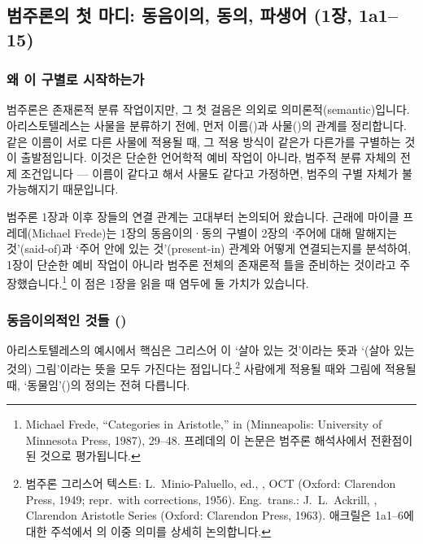 \documentclass[12pt, a4paper]{article}
\begin{document}
\thispagestyle{firstpage}


\subsection{범주론의 첫 마디: 동음이의, 동의, 파생어 (1장, 1a1--15)}

\subsubsection{왜 이 구별로 시작하는가}

범주론은 존재론적 분류 작업이지만, 그 첫 걸음은 의외로 의미론적(semantic)입니다. 아리스토텔레스는 사물을 분류하기 전에, 먼저 이름()과 사물()의 관계를 정리합니다. 같은 이름이 서로 다른 사물에 적용될 때, 그 적용 방식이 같은가 다른가를 구별하는 것이 출발점입니다. 이것은 단순한 언어학적 예비 작업이 아니라, 범주적 분류 자체의 전제 조건입니다 --- 이름이 같다고 해서 사물도 같다고 가정하면, 범주의 구별 자체가 불가능해지기 때문입니다.

범주론 1장과 이후 장들의 연결 관계는 고대부터 논의되어 왔습니다. 근래에 마이클 프레데(Michael Frede)는 1장의 동음이의·동의 구별이 2장의 `주어에 대해 말해지는 것'(said-of)과 `주어 안에 있는 것'(present-in) 관계와 어떻게 연결되는지를 분석하여, 1장이 단순한 예비 작업이 아니라 범주론 전체의 존재론적 틀을 준비하는 것이라고 주장했습니다.\footnote{Michael Frede, ``Categories in Aristotle,'' in  (Minneapolis: University of Minnesota Press, 1987), 29--48. 프레데의 이 논문은 범주론 해석사에서 전환점이 된 것으로 평가됩니다.} 이 점은 1장을 읽을 때 염두에 둘 가치가 있습니다.

\subsubsection{동음이의적인 것들 ()}


아리스토텔레스의 예시에서 핵심은 그리스어 이 `살아 있는 것'이라는 뜻과 `(살아 있는 것의) 그림'이라는 뜻을 모두 가진다는 점입니다.\footnote{범주론 그리스어 텍스트: L.\ Minio-Paluello, ed., , OCT (Oxford: Clarendon Press, 1949; repr.\ with corrections, 1956). Eng.\ trans.: J.\ L.\ Ackrill, , Clarendon Aristotle Series (Oxford: Clarendon Press, 1963). 애크릴은 1a1--6에 대한 주석에서 의 이중 의미를 상세히 논의합니다.} 사람에게 적용될 때와 그림에 적용될 때, `동물임'()의 정의는 전혀 다릅니다.
\end{document}
